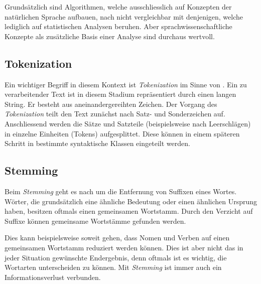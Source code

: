 Grundsätzlich sind Algorithmen, welche ausschliesslich auf Konzepten der natürlichen Sprache aufbauen, nach \cite{kantor2001foundations} nicht vergleichbar mit denjenigen, welche lediglich auf statistischen Analysen beruhen. Aber sprachwissenschaftliche Konzepte als zusätzliche Basis einer Analyse sind durchaus wertvoll.


\subsection{Tokenization}\label{tokenization}


Ein wichtiger Begriff in diesem Kontext ist \textit{Tokenization} im Sinne von \cite{grefenstette1994word}. Ein zu verarbeitender Text ist in diesem Stadium repräsentiert durch einen langen String. Er besteht aus aneinandergereihten Zeichen. Der Vorgang des \textit{Tokenization} teilt den Text zunächst nach Satz- und Sonderzeichen auf. Anschliessend werden die Sätze und Satzteile (beispielsweise nach Leerschlägen) in einzelne Einheiten (Tokens) aufgesplittet. Diese können in einem späteren Schritt in bestimmte syntaktische Klassen eingeteilt werden.


\subsection{Stemming}


Beim \textit{Stemming} geht es nach \cite{porter1980algorithm} um die Entfernung von Suffixen eines Wortes. Wörter, die grundsätzlich eine ähnliche Bedeutung oder einen ähnlichen Ursprung haben, besitzen oftmals einen gemeinsamen Wortstamm. Durch den Verzicht auf Suffixe können gemeinsame Wort\-stäm\-me gefunden werden.

Dies kann beispielsweise soweit gehen, dass Nomen und Verben auf einen gemeinsamen Wortstamm reduziert werden können. Dies ist aber nicht das in jeder Situation gewünschte Endergebnis, denn oftmals ist es wichtig, die Wortarten unterscheiden zu können. Mit \textit{Stemming} ist immer auch ein Informationsverlust verbunden. 

